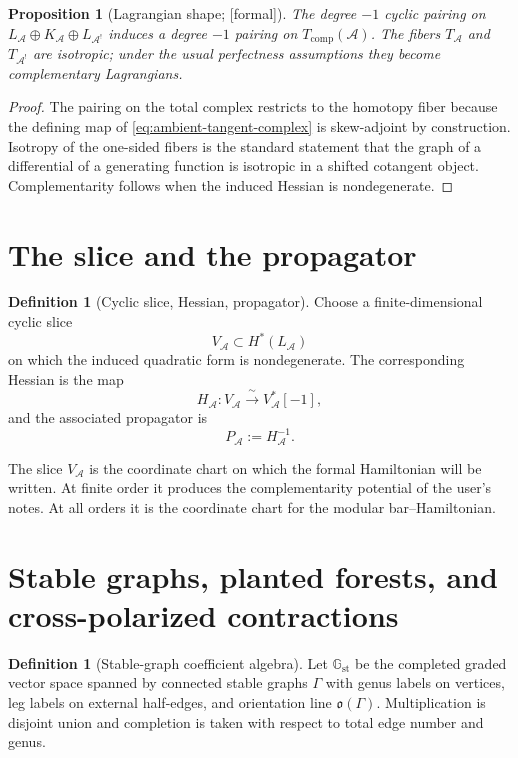 \documentclass[11pt,oneside]{memoir}
\numberwithin{equation}{chapter}
\newtheorem{proposition}[theorem]{Proposition}
\theoremstyle{definition}
\newtheorem{definition}[theorem]{Definition}
\newcommand{\ClaimStatusProvedHere}{\textnormal{[formal]}}
\newcommand{\cA}{\mathcal A}
\newcommand{\orline}{\mathfrak{o}}
\begin{document}
\begin{proposition}[Lagrangian shape; \ClaimStatusProvedHere]
\label{prop:lagrangian-shape}
The degree \(-1\) cyclic pairing on \(L_{\cA}\oplus K_{\cA}\oplus L_{\cA^!}\) induces a degree \(-1\) pairing on \(T_{\mathrm{comp}}(\cA)\).  The fibers \(T_{\cA}\) and \(T_{\cA^!}\) are isotropic; under the usual perfectness assumptions they become complementary Lagrangians.
\end{proposition}

\begin{proof}
The pairing on the total complex restricts to the homotopy fiber because the defining map of \eqref{eq:ambient-tangent-complex} is skew-adjoint by construction.  Isotropy of the one-sided fibers is the standard statement that the graph of a differential of a generating function is isotropic in a shifted cotangent object.  Complementarity follows when the induced Hessian is nondegenerate.
\end{proof}

\section{The slice and the propagator}

\begin{definition}[Cyclic slice, Hessian, propagator]
\label{def:slice-propagator}
Choose a finite-dimensional cyclic slice
\[
V_{\cA}\subset H^\ast(L_{\cA})
\]
on which the induced quadratic form is nondegenerate.  The corresponding Hessian is the map
\[
H_{\cA}:V_{\cA}\xrightarrow{\ \sim\ }V_{\cA}^*[-1],
\]
and the associated propagator is
\[
P_{\cA}:=H_{\cA}^{-1}.
\]
\end{definition}

The slice \(V_{\cA}\) is the coordinate chart on which the formal Hamiltonian will be written.  At finite order it produces the complementarity potential of the user's notes.  At all orders it is the coordinate chart for the modular bar--Hamiltonian.

\section{Stable graphs, planted forests, and cross-polarized contractions}

\begin{definition}[Stable-graph coefficient algebra]
\label{def:stable-graph-coefficients}
Let \(\mathbb G_{\mathrm{st}}\) be the completed graded vector space spanned by connected stable graphs \(\Gamma\) with genus labels on vertices, leg labels on external half-edges, and orientation line \(\orline(\Gamma)\).  Multiplication is disjoint union and completion is taken with respect to total edge number and genus.
\end{definition}
\end{document}
